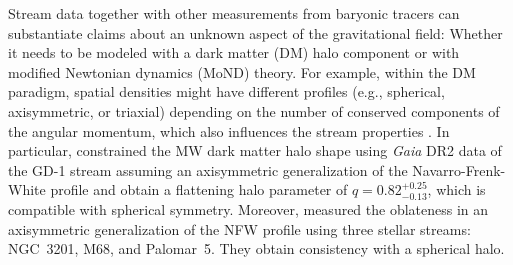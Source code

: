 \documentclass[twocolumn]{aa}
\begin{document}
Stream data together with other measurements from baryonic tracers can substantiate claims about an unknown aspect of the gravitational field: Whether it needs to be modeled with a dark matter (DM) halo component or with modified Newtonian dynamics (MoND) theory.
For example, within the DM paradigm, spatial densities might have different profiles
(e.g., spherical, axisymmetric, or triaxial) depending on the number of conserved components of the angular momentum, which also influences the stream properties \citep{2013ApJ...773L...4V,2016MNRAS.455.1079P,2020MNRAS.492.4398M}.
In particular, \citet{2019MNRAS.486.2995M} constrained the MW dark matter halo shape using {\it Gaia} DR2 data of the GD-1 stream assuming an axisymmetric generalization of the Navarro-Frenk-White profile \citep[NFW,][]{1996ApJ...462..563N} and obtain a flattening halo parameter of $q=0.82^{+0.25}_{-0.13}$, which is compatible with spherical symmetry.
Moreover, \cite{2023MNRAS.524.2124P} measured the oblateness in an axisymmetric generalization of the NFW profile using three stellar streams: NGC~3201, M68, and Palomar~5. They obtain
consistency with a spherical halo.
\end{document}
